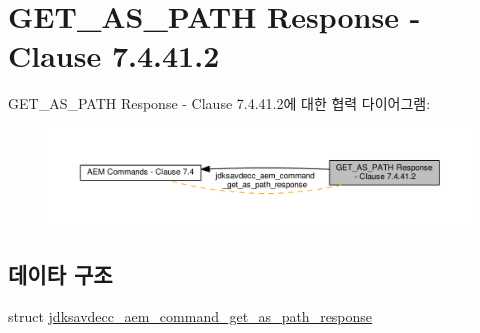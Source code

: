 \hypertarget{group__command__get__as__path__response}{}\section{G\+E\+T\+\_\+\+A\+S\+\_\+\+P\+A\+TH Response -\/ Clause 7.4.41.2}
\label{group__command__get__as__path__response}
G\+E\+T\+\_\+\+A\+S\+\_\+\+P\+A\+TH Response -\/ Clause 7.4.41.2에 대한 협력 다이어그램\+:
\nopagebreak
\begin{figure}[H]
\begin{center}
\leavevmode
\includegraphics[width=350pt]{group__command__get__as__path__response}
\end{center}
\end{figure}
\subsection*{데이타 구조}
\begin{DoxyCompactItemize}
\item 
struct \hyperlink{structjdksavdecc__aem__command__get__as__path__response}{jdksavdecc\+\_\+aem\+\_\+command\+\_\+get\+\_\+as\+\_\+path\+\_\+response}
\end{DoxyCompactItemize}
